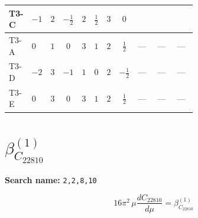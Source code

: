 \documentclass[8pt]{article}
\begin{document}
\begin{landscape}
\begin{longtable}{@{}llcccccc >{\raggedright\arraybackslash}p{0.21\linewidth} >{\raggedright\arraybackslash}p{0.21\linewidth} >{\raggedright\arraybackslash}p{0.21\linewidth}@{}}
T3-C & $-1$ & $2$ & $-\frac{1}{2}$ & $2$ & $\frac{1}{2}$ & $3$ & $0$ & \scriptsize\adjustbox{max width=\linewidth}{$\begin{gathered} \frac{i lambda12Inv2 \overline{y_{1}} \overline{y_{2}}}{3 MF}\end{gathered}$} & \scriptsize\adjustbox{max width=\linewidth}{$\begin{gathered} \frac{\sqrt{3} i g_{2}^{2} \overline{y_{1}} \overline{y_{2}}}{4 MF}\end{gathered}$} & \scriptsize\adjustbox{max width=\linewidth}{$\begin{gathered} - \frac{\sqrt{3} i ye \overline{y_{1}} \overline{y_{2}} \overline{ye}}{12 MF}\end{gathered}$} \\
\midrule
T3-A & $0$ & $1$ & $0$ & $3$ & $1$ & $2$ & $\frac{1}{2}$ & --- & --- & --- \\
\midrule
T3-D & $-2$ & $3$ & $-1$ & $1$ & $0$ & $2$ & $-\frac{1}{2}$ & --- & --- & --- \\
\midrule
T3-E & $0$ & $3$ & $0$ & $3$ & $1$ & $2$ & $\frac{1}{2}$ & --- & --- & --- \\
\midrule
\bottomrule
\end{longtable}
\clearpage
\section*{$\beta_{C_{22810}}^{(1)}$}
\noindent\textbf{Search name: }\texttt{2,2,8,10}\par\smallskip
\[16\pi^2\,\mu\frac{d C_{22810}}{d\mu}=\beta_{C_{22810}}^{(1)}\]

\end{landscape}
\end{document}
